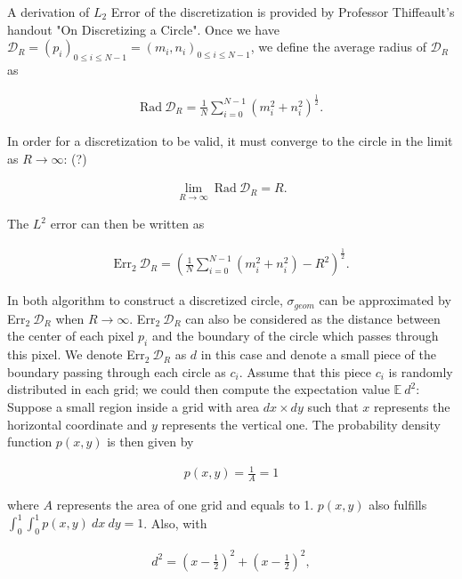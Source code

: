 \documentclass[letterpaper]{article}
\numberwithin{equation}{section} %
\numberwithin{figure}{section} %
\numberwithin{table}{section} %
\begin{document}
A derivation of $L_{2}$ Error of the discretization is provided by Professor Thiffeault's handout "On Discretizing a Circle". Once we have $\mathcal{D}_R=(p_{i})_{0 \leq i \leq N-1} = (m_i, n_i)_{0 \leq i \leq N-1}$, we define the average radius of $\mathcal{D}_R$ as


\begin{align} 
\text{Rad} \ \mathcal{D}_R=\frac{1}{N} \sum_{i=0}^{N-1} (m_i^2+n_i^2)^{\frac{1}{2}}.
\end{align}

\noindent
In order for a discretization to be valid, it must converge to the circle in the limit as $R \rightarrow \infty$: (?)

\begin{align} 
\lim_{R \rightarrow \infty} \ \text{Rad} \ \mathcal{D}_R = R.
\end{align}

\noindent
The $L^2$ error can then be written as 

\begin{align} 
\text{Err}_2 \ \mathcal{D}_R=(\frac{1}{N} \sum_{i=0}^{N-1} (m_i^2+n_i^2)-R^2)^{\frac{1}{2}}.
\end{align}


In both algorithm to construct a discretized circle, $\sigma_{geom}$ can be approximated by Err$_2 \ \mathcal{D}_R$ when $R \rightarrow \infty$. Err$_2 \ \mathcal{D}_R$ can also be considered as the distance between the center of each pixel $p_i$ and the boundary of the circle which passes through this pixel. We denote Err$_2 \ \mathcal{D}_R$ as $d$ in this case and denote a small piece of the boundary passing through each circle as $c_i$. Assume that this piece $c_i$ is randomly distributed in each grid; we could then compute the expectation value $\mathbb{E}\ d^2$: Suppose a small region inside a grid with area $dx \times dy$ such that $x$ represents the horizontal coordinate and $y$ represents the vertical one. The probability density function $p(x,y)$ is then given by

\begin{align} 
p(x,y)=\frac{1}{A}=1
\end{align}

\noindent
where $A$ represents the area of one grid and equals to 1. $p(x,y)$ also fulfills $\int_{0}^{1}\int_{0}^{1}p(x,y) \ dx \ dy=1$. Also, with 

\begin{align} 
d^2=(x-\frac{1}{2})^2+(x-\frac{1}{2})^2,
\end{align}
\end{document}
